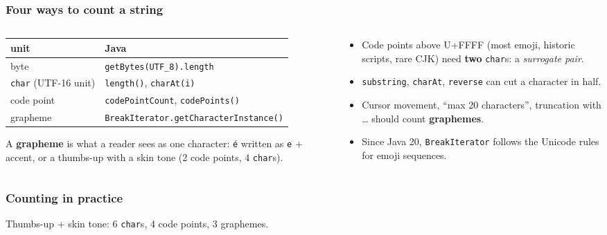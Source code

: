 \documentclass[aspectratio=169,10pt,compress]{beamer}
\begin{document}
\begin{frame}[t,fragile] \frametitle{Four ways to count a string}
  \begin{columns}[T]
    \begin{column}{0.54\textwidth}
      \begin{center}\scriptsize
      \begin{tabular}{ll}
        \toprule
        \textbf{unit} & \textbf{Java} \\
        \midrule
        byte       & \texttt{getBytes(UTF\_8).length} \\
        \texttt{char} (UTF-16 unit) & \texttt{length()}, \texttt{charAt(i)} \\
        code point & \texttt{codePointCount}, \texttt{codePoints()} \\
        grapheme   & \texttt{BreakIterator.getCharacterInstance()} \\
        \bottomrule
      \end{tabular}
      \end{center}
      \small A \textbf{grapheme} is what a reader sees as one character: \texttt{é} written as \texttt{e} + accent,
      or a thumbs-up with a skin tone (2 code points, 4 \texttt{char}s).
    \end{column}
    \begin{column}{0.42\textwidth}
      \begin{itemize}\small
        \item Code points above U+FFFF (most emoji, historic scripts, rare CJK) need \textbf{two} \texttt{char}s:
          a \emph{surrogate pair}.
        \item \texttt{substring}, \texttt{charAt}, \texttt{reverse} can cut a character in half.
        \item Cursor movement, ``max 20 characters'', truncation with \dots{} should count \textbf{graphemes}.
        \item Since Java 20, \texttt{BreakIterator} follows the Unicode rules for emoji sequences.
      \end{itemize}
    \end{column}
  \end{columns}
\end{frame}




\begin{frame}[t,fragile] \frametitle{Counting in practice}

  \vspace{0.1em}
  \small
  Thumbs-up + skin tone: 6 \texttt{char}s, 4 code points, 3 graphemes.
\end{frame}
\end{document}
